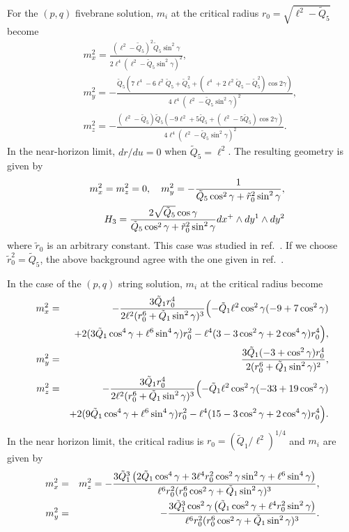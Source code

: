 \documentclass[a4paper,12pt]{article}
\begin{document}
For the $(p,q)$ fivebrane solution, $m_i$
at the critical radius $r_0=\sqrt{\ell^2-\tilde{Q}_{5}}$
become
\begin{eqnarray}
&&m_x^2=\frac{(\ell^2-\tilde{Q}_5)^2\tilde{Q}_5\sin^2\gamma}
{2\ell^4(\ell^2-\tilde{Q}_5\sin^2\gamma)^2}, \nonumber \\
&&m_y^2=-\frac{\tilde{Q}_5(7\ell^4-6\ell^2\tilde{Q}_5+\tilde{Q}_5^2
+(\ell^4+2\ell^2\tilde{Q}_5-\tilde{Q}_5^2)\cos 2\gamma)}
{4\ell^4(\ell^2-\tilde{Q}_5\sin^2\gamma)^2}, \nonumber \\
&&m_z^2=-\frac{(\ell^2-\tilde{Q}_5)\tilde{Q}_5(-9\ell^2+5\tilde{Q}_5
+(\ell^2-5\tilde{Q}_5)\cos 2\gamma)}
{4\ell^4(\ell^2-\tilde{Q}_5\sin^2\gamma)^2}.
\end{eqnarray}
In the near-horizon limit, $dr/du=0$ when
$\tilde{Q}_5=\ell^2$. 
The resulting geometry is given by
\begin{eqnarray}
&& m_{x}^2=m_{z}^2=0,\quad
m_{y}^2=-{1\over \tilde{Q}_5\cos^2\gamma+\tilde{r}_0^2\sin^2\gamma}, 
\nonumber \\
&&H_3=\frac{2\sqrt{\tilde{Q}_5}\cos\gamma}
{\tilde{Q}_5\cos^2\gamma +\tilde{r}_0^2\sin^2\gamma}
dx^{+}\wedge dy^1\wedge dy^2
\end{eqnarray}
where $\tilde{r}_0$ is an arbitrary constant.
This case was studied in ref.~\cite{OzSa}. 
If we choose $\tilde{r}_0^2=\tilde{Q}_5$,
the above background agree with the one given
in ref.~\cite{OzSa}.

In the case of the $(p,q)$ string solution, 
$m_i$  at the critical radius become
 \begin{eqnarray}
   m_{x}^2&=& 
 -{3\tilde{Q}_{1} r_{0}^4
 \over 2 \ell^2 (r_{0}^6+\tilde{Q}_{1}\sin^2\gamma)^3 }
 \Bigl(
 -\tilde{Q}_{1} \ell^2 \cos^2\gamma (-9+7\cos^2\gamma)
 \nonumber\\
 &&
 +2 (3\tilde{Q}_{1}\cos^4\gamma+\ell^6\sin^4\gamma)r_{0}^2
 -\ell^4(3-3\cos^2\gamma+2\cos^4\gamma)r_{0}^4
 \Bigr), \nonumber\\
 m_{y}^2&=&
 {3 \tilde{Q}_{1}(-3+\cos^2\gamma)r_{0}^4\over 2 (
 r_{0}^6+\tilde{Q}_{1}\sin^2\gamma
 )^2},\nonumber\\
 m_{z}^2&=& 
 -{3\tilde{Q}_{1} r_{0}^4
 \over 2 \ell^2 (r_{0}^6+\tilde{Q}_{1}\sin^2\gamma)^3 }
 \Bigl(
 -\tilde{Q}_{1} \ell^2 \cos^2\gamma (-33+19\cos^2\gamma)
 \nonumber\\
 &&
 +2(9\tilde{Q}_{1}\cos^4\gamma+\ell^6\sin^4\gamma)r_{0}^2
 -\ell^4(15-3\cos^2\gamma+2\cos^4\gamma)r_{0}^4
 \Bigr).
 \end{eqnarray}
In the near horizon limit, 
the critical radius is $r_0=(\tilde{Q}_1/\ell^2)^{1/4}$ and
$m_i$ are given by
\begin{eqnarray}
 m_{x}^2&=& m_{z}^2=
-{3\tilde{Q}_{1}^3
\left(
2\tilde{Q}_{1}\cos^4\gamma+3\ell^4 r_{0}^2 \cos^2\gamma\sin^2\gamma
+\ell^6 \sin^4\gamma
\right)
\over \ell^6 r_{0}^2 
(r_{0}^6\cos^2\gamma+\tilde{Q}_{1}\sin^2\gamma)^3},\nonumber
\\
m_{y}^2&=&
-{3\tilde{Q}_{1}^3\cos^2\gamma
\left(
\tilde{Q}_{1}\cos^2\gamma+\ell^4r_{0}^2\sin^2\gamma
\right)
\over \ell^6 r_{0}^2 
(r_{0}^6\cos^2\gamma+\tilde{Q}_{1}\sin^2\gamma)^3}.
\end{eqnarray}
\end{document}
